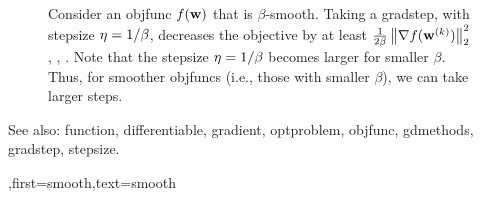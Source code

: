 {{\begin{figure}[H]
\begin{center}
	    	\end{center}
	    	\caption{Consider an \gls{objfunc} $f({\bf w})$ that is $\beta$-smooth. 
	    		Taking a \gls{gradstep}, with \gls{stepsize} $\eta = 1/\beta$, decreases the 
	    		objective by at least $\frac{1}{2\beta}\left\Vert {\nabla f({\bf w}^{(k)})} \right\Vert_{2}^{2}$ \cite{nesterov04}, \cite{CvxBubeck2015}, \cite{CvxAlgBertsekas}. 
	    		Note that the \gls{stepsize} $\eta = 1/\beta$ becomes larger for smaller $\beta$. Thus, 
	    		for smoother \glspl{objfunc} (i.e., those with smaller $\beta$), 
				we can take larger steps. \label{fig_gd_smooth_dict}}
	    	\end{figure}
		See also: \gls{function}, \gls{differentiable}, \gls{gradient}, \gls{optproblem}, \gls{objfunc}, \gls{gdmethods}, \gls{gradstep}, \gls{stepsize}.
	    },first={smooth},text={smooth}}

